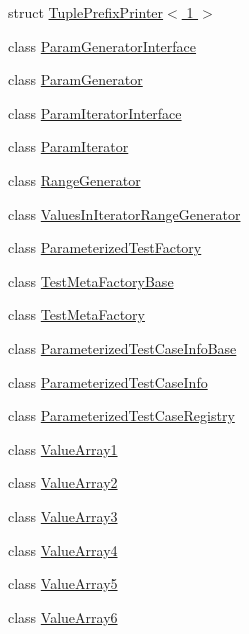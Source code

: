 \begin{DoxyCompactItemize}
\item 
struct \hyperlink{structtesting_1_1internal_1_1TuplePrefixPrinter_3_011_01_4}{Tuple\-Prefix\-Printer$<$ 1 $>$}
\item 
class \hyperlink{classtesting_1_1internal_1_1ParamGeneratorInterface}{Param\-Generator\-Interface}
\item 
class \hyperlink{classtesting_1_1internal_1_1ParamGenerator}{Param\-Generator}
\item 
class \hyperlink{classtesting_1_1internal_1_1ParamIteratorInterface}{Param\-Iterator\-Interface}
\item 
class \hyperlink{classtesting_1_1internal_1_1ParamIterator}{Param\-Iterator}
\item 
class \hyperlink{classtesting_1_1internal_1_1RangeGenerator}{Range\-Generator}
\item 
class \hyperlink{classtesting_1_1internal_1_1ValuesInIteratorRangeGenerator}{Values\-In\-Iterator\-Range\-Generator}
\item 
class \hyperlink{classtesting_1_1internal_1_1ParameterizedTestFactory}{Parameterized\-Test\-Factory}
\item 
class \hyperlink{classtesting_1_1internal_1_1TestMetaFactoryBase}{Test\-Meta\-Factory\-Base}
\item 
class \hyperlink{classtesting_1_1internal_1_1TestMetaFactory}{Test\-Meta\-Factory}
\item 
class \hyperlink{classtesting_1_1internal_1_1ParameterizedTestCaseInfoBase}{Parameterized\-Test\-Case\-Info\-Base}
\item 
class \hyperlink{classtesting_1_1internal_1_1ParameterizedTestCaseInfo}{Parameterized\-Test\-Case\-Info}
\item 
class \hyperlink{classtesting_1_1internal_1_1ParameterizedTestCaseRegistry}{Parameterized\-Test\-Case\-Registry}
\item 
class \hyperlink{classtesting_1_1internal_1_1ValueArray1}{Value\-Array1}
\item 
class \hyperlink{classtesting_1_1internal_1_1ValueArray2}{Value\-Array2}
\item 
class \hyperlink{classtesting_1_1internal_1_1ValueArray3}{Value\-Array3}
\item 
class \hyperlink{classtesting_1_1internal_1_1ValueArray4}{Value\-Array4}
\item 
class \hyperlink{classtesting_1_1internal_1_1ValueArray5}{Value\-Array5}
\item 
class \hyperlink{classtesting_1_1internal_1_1ValueArray6}{Value\-Array6}

\end{DoxyCompactItemize}
